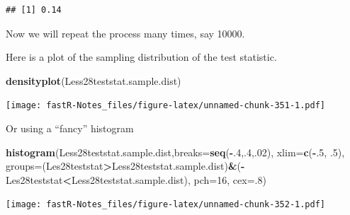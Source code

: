 \documentclass[]{book}
\newenvironment{Shaded}{\begin{snugshade}}{\end{snugshade}}
\newcommand{\KeywordTok}[1]{\textcolor[rgb]{0.13,0.29,0.53}{\textbf{#1}}}
\newcommand{\DataTypeTok}[1]{\textcolor[rgb]{0.13,0.29,0.53}{#1}}
\newcommand{\DecValTok}[1]{\textcolor[rgb]{0.00,0.00,0.81}{#1}}
\newcommand{\OtherTok}[1]{\textcolor[rgb]{0.56,0.35,0.01}{#1}}
\newcommand{\OperatorTok}[1]{\textcolor[rgb]{0.81,0.36,0.00}{\textbf{#1}}}
\newcommand{\NormalTok}[1]{#1}
\theoremstyle{definition}
\theoremstyle{definition}
\theoremstyle{definition}
\theoremstyle{remark}
\begin{document}
\begin{verbatim}
## [1] 0.14
\end{verbatim}

Now we will repeat the process many times, say 10000.

\begin{Shaded}
\end{Shaded}

Here is a plot of the sampling distribution of the test statistic.

\begin{Shaded}
\begin{Highlighting}[]
\KeywordTok{densityplot}\NormalTok{(Less28teststat.sample.dist)}
\end{Highlighting}
\end{Shaded}

\texttt{[image: fastR-Notes\_files/figure-latex/unnamed-chunk-351-1.pdf]}

Or using a ``fancy'' histogram

\begin{Shaded}
\begin{Highlighting}[]
\KeywordTok{histogram}\NormalTok{(Less28teststat.sample.dist,}\DataTypeTok{breaks=}\KeywordTok{seq}\NormalTok{(}\OperatorTok{-}\NormalTok{.}\DecValTok{4}\NormalTok{,.}\DecValTok{4}\NormalTok{,.}\DecValTok{02}\NormalTok{), }\DataTypeTok{xlim=}\KeywordTok{c}\NormalTok{(}\OperatorTok{-}\NormalTok{.}\DecValTok{5}\NormalTok{, .}\DecValTok{5}\NormalTok{),}
\DataTypeTok{groups=}\NormalTok{(Les28teststat}\OperatorTok{>}\NormalTok{Less28teststat.sample.dist)}\OperatorTok{&}\NormalTok{(}\OperatorTok{-}\NormalTok{Les28teststat}\OperatorTok{<}\NormalTok{Less28teststat.sample.dist), }\DataTypeTok{pch=}\DecValTok{16}\NormalTok{, }\DataTypeTok{cex=}\NormalTok{.}\DecValTok{8}\NormalTok{)}
\end{Highlighting}
\end{Shaded}

\texttt{[image: fastR-Notes\_files/figure-latex/unnamed-chunk-352-1.pdf]}
\end{document}
